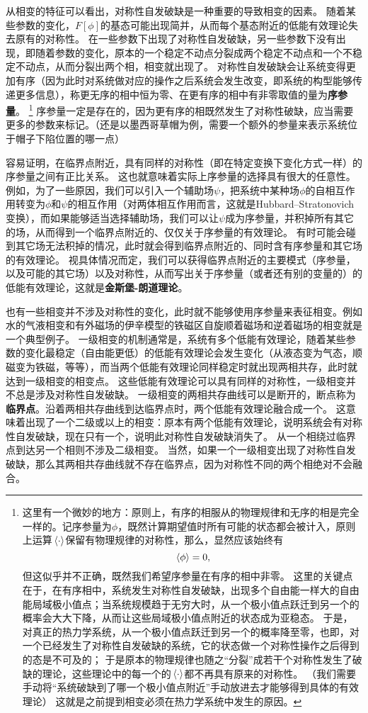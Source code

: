 \documentclass[hyperref, UTF8, a4paper]{ctexart}
\begin{document}
从相变的特征可以看出，对称性自发破缺是一种重要的导致相变的因素。
随着某些参数的变化，$F[\phi]$的基态可能出现简并，从而每个基态附近的低能有效理论失去原有的对称性。
在一些参数下出现了对称性自发破缺，另一些参数下没有出现，即随着参数的变化，原本的一个稳定不动点分裂成两个稳定不动点和一个不稳定不动点，从而分裂出两个相，相变就出现了。
对称性自发破缺会让系统变得更加有序（因为此时对系统做对应的操作之后系统会发生改变，即系统的构型能够传递更多信息），称更无序的相中恒为零、在更有序的相中有非零取值的量为\textbf{序参量}。%
\footnote{这里有一个微妙的地方：原则上，有序的相服从的物理规律和无序的相是完全一样的。记序参量为$\phi$，既然计算期望值时所有可能的状态都会被计入，原则上运算$\expval*{\cdot}$保留有物理规律的对称性，那么，显然应该始终有
\[
    \expval*{\phi} = 0,
\]
但这似乎并不正确，既然我们希望序参量在有序的相中非零。
这里的关键点在于，在有序相中，系统发生对称性自发破缺，出现多个自由能一样大的自由能局域极小值点；当系统规模趋于无穷大时，从一个极小值点跃迁到另一个的概率会大大下降，从而让这些局域极小值点附近的状态成为亚稳态。
于是，对真正的热力学系统，从一个极小值点跃迁到另一个的概率降至零，也即，对一个已经发生了对称性自发破缺的系统，它的状态做一个对称性操作之后得到的态是不可及的；
于是原本的物理规律也随之“分裂”成若干个对称性发生了破缺的理论，这些理论中的每一个的$\expval*{\cdot}$都不再具有原来的对称性。
（我们需要手动将“系统破缺到了哪一个极小值点附近”手动放进去才能够得到具体的有效理论）
这就是之前提到相变必须在热力学系统中发生的原因。
}%
序参量一定是存在的，因为更有序的相既然发生了对称性破缺，应当需要更多的参数来标记。（还是以墨西哥草帽为例，需要一个额外的参量来表示系统位于帽子下陷位置的哪一点）

容易证明，在临界点附近，具有同样的对称性（即在特定变换下变化方式一样）的序参量之间有正比关系。
这也就意味着实际上序参量的选择具有很大的任意性。
例如，为了一些原因，我们可以引入一个辅助场$\psi$，把系统中某种场$\phi$的自相互作用转变为$\phi$和$\psi$的相互作用（对两体相互作用而言，这就是Hubbard–Stratonovich变换），而如果能够适当选择辅助场，我们可以让$\psi$成为序参量，并积掉所有其它的场，从而得到一个临界点附近的、仅仅关于序参量的有效理论。
有时可能会碰到其它场无法积掉的情况，此时就会得到临界点附近的、同时含有序参量和其它场的有效理论。
视具体情况而定，我们可以获得临界点附近的主要模式（序参量，以及可能的其它场）以及对称性，从而写出关于序参量（或者还有别的变量的）的低能有效理论，这就是\textbf{金斯堡-朗道理论}。


也有一些相变并不涉及对称性的变化，此时就不能够使用序参量来表征相变。例如水的气液相变和有外磁场的伊辛模型的铁磁区自旋顺着磁场和逆着磁场的相变就是一个典型例子。
一级相变的机制通常是，系统有多个低能有效理论，随着某些参数的变化最稳定（自由能更低）的低能有效理论会发生变化（从液态变为气态，顺磁变为铁磁，等等），而当两个低能有效理论同样稳定时就出现两相共存，此时就达到一级相变的相变点。
这些低能有效理论可以具有同样的对称性，一级相变并不总是涉及对称性自发破缺。
一级相变的两相共存曲线可以是断开的，断点称为\textbf{临界点}。沿着两相共存曲线到达临界点时，两个低能有效理论融合成一个。
这意味着出现了一个二级或以上的相变：原本有两个低能有效理论，说明系统会有对称性自发破缺，现在只有一个，说明此对称性自发破缺消失了。
从一个相绕过临界点到达另一个相则不涉及二级相变。
当然，如果一个一级相变出现了对称性自发破缺，那么其两相共存曲线就不存在临界点，因为对称性不同的两个相绝对不会融合。
\end{document}
